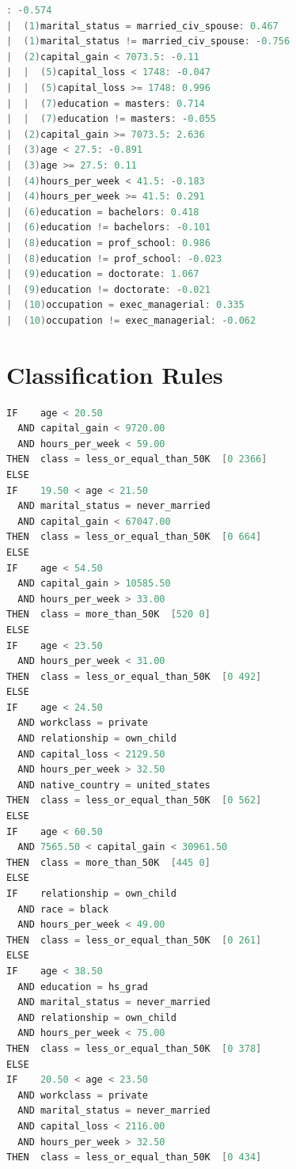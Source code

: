 \documentclass[a4paper]{llncs}
\begin{document}
\clearpage
\begin{lstlisting}[language=c,frame=single,breaklines=true,basicstyle=\footnotesize\ttfamily,caption={Decision tree built by ADTree with -E -2 -B 10},label=decision_tree_adtree]
: -0.574
|  (1)marital_status = married_civ_spouse: 0.467
|  (1)marital_status != married_civ_spouse: -0.756
|  (2)capital_gain < 7073.5: -0.11
|  |  (5)capital_loss < 1748: -0.047
|  |  (5)capital_loss >= 1748: 0.996
|  |  (7)education = masters: 0.714
|  |  (7)education != masters: -0.055
|  (2)capital_gain >= 7073.5: 2.636
|  (3)age < 27.5: -0.891
|  (3)age >= 27.5: 0.11
|  (4)hours_per_week < 41.5: -0.183
|  (4)hours_per_week >= 41.5: 0.291
|  (6)education = bachelors: 0.418
|  (6)education != bachelors: -0.101
|  (8)education = prof_school: 0.986
|  (8)education != prof_school: -0.023
|  (9)education = doctorate: 1.067
|  (9)education != doctorate: -0.021
|  (10)occupation = exec_managerial: 0.335
|  (10)occupation != exec_managerial: -0.062
\end{lstlisting}

\clearpage
\section{Classification Rules}
\begin{lstlisting}[language=c,frame=single,breaklines=true,basicstyle=\footnotesize\ttfamily,caption={Subset of the ordered set of rules induced by CN2 with the laplacian error estimation method},label=cn2_rules]
IF    age < 20.50
  AND capital_gain < 9720.00
  AND hours_per_week < 59.00
THEN  class = less_or_equal_than_50K  [0 2366]
ELSE
IF    19.50 < age < 21.50
  AND marital_status = never_married
  AND capital_gain < 67047.00
THEN  class = less_or_equal_than_50K  [0 664]
ELSE
IF    age < 54.50
  AND capital_gain > 10585.50
  AND hours_per_week > 33.00
THEN  class = more_than_50K  [520 0]
ELSE
IF    age < 23.50
  AND hours_per_week < 31.00
THEN  class = less_or_equal_than_50K  [0 492]
ELSE
IF    age < 24.50
  AND workclass = private
  AND relationship = own_child
  AND capital_loss < 2129.50
  AND hours_per_week > 32.50
  AND native_country = united_states
THEN  class = less_or_equal_than_50K  [0 562]
ELSE
IF    age < 60.50
  AND 7565.50 < capital_gain < 30961.50
THEN  class = more_than_50K  [445 0]
ELSE
IF    relationship = own_child
  AND race = black
  AND hours_per_week < 49.00
THEN  class = less_or_equal_than_50K  [0 261]
ELSE
IF    age < 38.50
  AND education = hs_grad
  AND marital_status = never_married
  AND relationship = own_child
  AND hours_per_week < 75.00
THEN  class = less_or_equal_than_50K  [0 378]
ELSE
IF    20.50 < age < 23.50
  AND workclass = private
  AND marital_status = never_married
  AND capital_loss < 2116.00
  AND hours_per_week > 32.50
THEN  class = less_or_equal_than_50K  [0 434]
\end{lstlisting}
\clearpage
\end{document}
